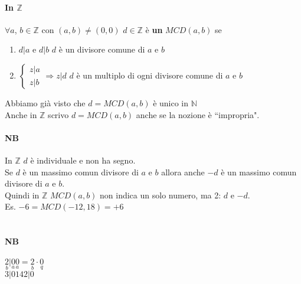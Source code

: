     \paragraph{In $\mathbb{Z}$} $\forall a$, $b\in\mathbb{Z}$ con {\color{red} $(a,b)\neq(0,0)$}
    $d\in\mathbb{Z}$ è \textbf{un} $MCD(a,b)$ se
    \begin{enumerate}
        \item $d|a$ e $d|b$ \hspace{1cm}$d$ è un divisore comune di $a$ e $b$
        \item 
            $    \begin{cases}
                    z|a\\
                    z|b
                \end{cases}
                \Longrightarrow z|d$
            \hspace{1cm}$d$ è un multiplo di ogni divisore comune di $a$ e $b$
    \end{enumerate}
    Abbiamo già visto che 
    $d=MCD(a,b) \textrm{ è unico in }\mathbb{N} $\\
    Anche in $\mathbb{Z}$ scrivo $d=MCD(a,b)$ anche se la nozione è ``impropria".
    \paragraph{NB} In $\mathbb{Z}$ $d$ è individuale e {\color{purple} non ha segno}.\\
    Se $d$ è un massimo comun divisore di $a$ e $b$ allora anche $-d$ è un massimo 
    comun divisore di $a$ e $b$.\\

    Quindi in $\mathbb{Z}$ $MCD(a,b)$ non indica un solo numero, ma 2: $d$ e $-d$.\\
    Es. $-6=MCD(-12, 18)=+6$\\\\
    {\large {}}
    \paragraph{NB}  $\underset{b}{2}|\underset{a}{0}$\hspace{1cm}$\underset{a}{0}=\underset{b}{2}\cdot\underset{q}{0}$\\
    $3|0$\hspace{1cm}$142|0$\\

